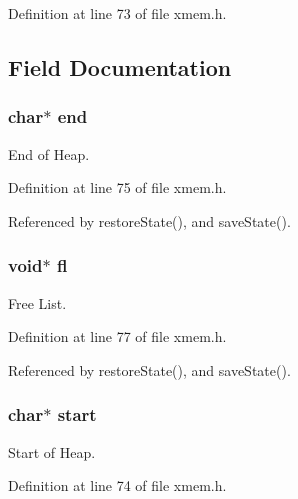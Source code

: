 Definition at line 73 of file xmem.\-h.



\subsection{Field Documentation}
\hypertarget{struct_malloc_state_a8fd806ad19b8f5513a4cf18cbf77532c}{
\subsubsection[{end}]{\setlength{\rightskip}{0pt plus 5cm}char$\ast$ end}}\label{struct_malloc_state_a8fd806ad19b8f5513a4cf18cbf77532c}


End of Heap. 



Definition at line 75 of file xmem.\-h.



Referenced by restore\-State(), and save\-State().

\hypertarget{struct_malloc_state_a2cd9ff81854efd20b4a1e414ac69f3dc}{
\subsubsection[{fl}]{\setlength{\rightskip}{0pt plus 5cm}void$\ast$ fl}}\label{struct_malloc_state_a2cd9ff81854efd20b4a1e414ac69f3dc}


Free List. 



Definition at line 77 of file xmem.\-h.



Referenced by restore\-State(), and save\-State().

\hypertarget{struct_malloc_state_ab40328f79e021050ac262dc0a6019667}{
\subsubsection[{start}]{\setlength{\rightskip}{0pt plus 5cm}char$\ast$ start}}\label{struct_malloc_state_ab40328f79e021050ac262dc0a6019667}


Start of Heap. 



Definition at line 74 of file xmem.\-h.



